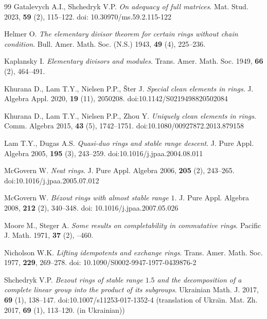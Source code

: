 \documentclass[10pt,a4paper]{amsart}
\theoremstyle{plain}
\theoremstyle{definition}
\begin{document}
\begin{thebibliography}{99}
 Gatalevych A.I., Shchedryk V.P. \textit{On adequacy of full matrices}.
Mat. Stud. 2023, \textbf{59} (2), 115--122.
doi: 10.30970/ms.59.2.115-122

 Helmer O. \textit{The elementary divisor theorem for certain rings without chain condition}.
Bull. Amer. Math. Soc. (N.S.) 1943, \textbf{49} (4), 225--236.

 Kaplansky I. \textit{Elementary divisors and modules}.
Trans. Amer. Math. Soc. 1949, \textbf{66} (2), 464--491.

 Khurana D., Lam T.Y., Nielsen P.P., \v{S}ter J. \textit{Special clean elements in rings}.
J. Algebra Appl. 2020, \textbf{19} (11), 2050208.
doi:10.1142/S0219498820502084

 Khurana D., Lam T.Y., Nielsen P.P., Zhou Y. \textit{Uniquely clean elements in rings}.
Comm. Algebra 2015, \textbf{43} (5), 1742--1751.
doi:10.1080/00927872.2013.879158

 Lam T.Y., Dugas A.S. \textit{Quasi-duo rings and stable range descent}.
J. Pure Appl. Algebra 2005, \textbf{195} (3), 243--259.
doi:10.1016/j.jpaa.2004.08.011

 McGovern W. \textit{Neat rings}.
J. Pure Appl. Algebra 2006, \textbf{205} (2), 243--265.
doi:10.1016/j.jpaa.2005.07.012

 McGovern W. \textit{B\'ezout rings with almost stable range $1$}.
J. Pure Appl. Algebra 2008, \textbf{212} (2), 340--348.
doi: 10.1016/j.jpaa.2007.05.026

 Moore M., Steger A. \textit{Some results on completability in commutative rings}.
Pacific J. Math. 1971, \textbf{37} (2), --460.

 Nicholson W.K. \textit{Lifting idempotents and exchange rings}.
Trans. Amer. Math. Soc. 1977, \textbf{229}, 269--278.
doi: 10.1090/S0002-9947-1977-0439876-2

 Shchedryk V.P. \textit{Bezout rings of stable range $1.5$ and the decomposition of a complete linear group into the product of its subgroups}.
Ukrainian Math. J. 2017, \textbf{69} (1), 138--147. doi:10.1007/s11253-017-1352-4
(translation of Ukra\"{\i}n. Mat. Zh. 2017, \textbf{69} (1), 113--120. (in Ukrainian))


\end{thebibliography}
\end{document}
